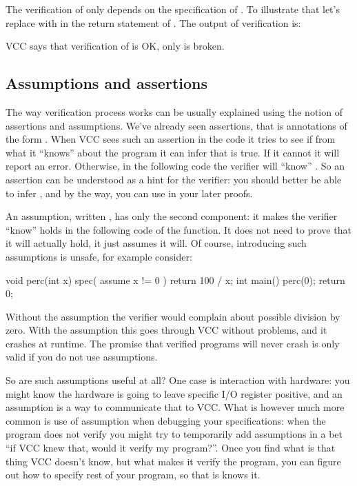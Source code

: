 The verification of  only depends on the specification of .
To illustrate that let's replace \vcc{<} with \vcc{>} in the return statement of .
The output of verification is:


\noindent
VCC says that verification of  is OK, only  is broken.

\subsection{Assumptions and assertions}

The way verification process works can be usually explained using the
notion of assertions and assumptions.
We've already seen assertions, that is annotations of the form .
When VCC sees such an assertion in the code
it tries to see if from what it ``knows'' about the program it can infer
that  is true.
If it cannot it will report an error.
Otherwise, in the following code the verifier will ``know'' .
So an assertion can be understood as a hint for the verifier:
you should better be able to infer , and by the way, you can use
 in your later proofs.

An assumption, written , has only the second component:
it makes the verifier ``know''  holds in the following code of the function.
It does not need to prove that it will actually hold, it just assumes it will.
Of course, introducing such assumptions is unsafe, for example consider:

\begin{VCC}
void perc(int x) {
  spec( assume x != 0 )
  return 100 / x;
}
int main()
{
  perc(0);
  return 0;
}
\end{VCC}

\noindent
Without the assumption the verifier would complain about possible division by zero.
With the assumption this goes through VCC without problems, and it crashes at runtime.
The promise that verified programs will never crash is only valid if you do not
use assumptions.

So are such assumptions useful at all?
One case is interaction with hardware: you might know the hardware is going to leave
specific I/O register positive, and an assumption is a way to communicate that to VCC.
What is however much more common is use of assumption when debugging your specifications:
when the program does not verify you might try to temporarily add assumptions in a bet
``if VCC knew that, would it verify my program?''.
Once you find what is that thing VCC doesn't know, but what makes it verify the program,
you can figure out how to specify rest of your program, so that is knows it.

